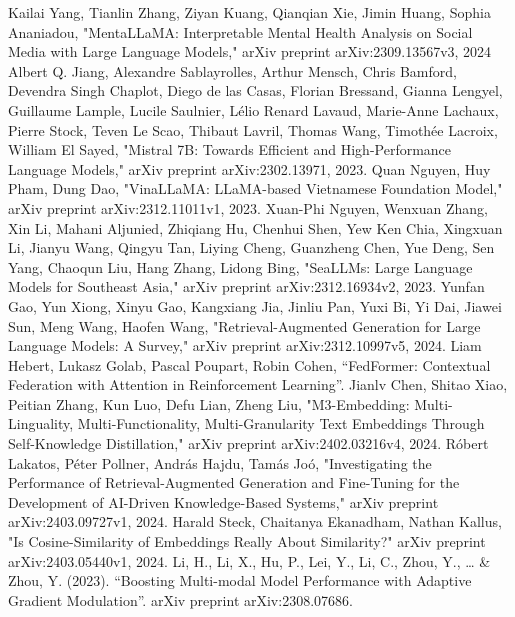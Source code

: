 \documentclass[conference]{IEEEtran}
\begin{document}
\begin{thebibliography}{9}
     Kailai Yang, Tianlin Zhang, Ziyan Kuang, Qianqian Xie, Jimin Huang, Sophia Ananiadou, "MentaLLaMA: Interpretable Mental Health Analysis on Social Media with Large Language Models," arXiv preprint arXiv:2309.13567v3, 2024
     Albert Q. Jiang, Alexandre Sablayrolles, Arthur Mensch, Chris Bamford, Devendra Singh Chaplot, Diego de las Casas, Florian Bressand, Gianna Lengyel, Guillaume Lample, Lucile Saulnier, Lélio Renard Lavaud, Marie-Anne Lachaux, Pierre Stock, Teven Le Scao, Thibaut Lavril, Thomas Wang, Timothée Lacroix, William El Sayed, "Mistral 7B: Towards Efficient and High-Performance Language Models," arXiv preprint arXiv:2302.13971, 2023.
     Quan Nguyen, Huy Pham, Dung Dao, "VinaLLaMA: LLaMA-based Vietnamese Foundation Model," arXiv preprint arXiv:2312.11011v1, 2023.
     Xuan-Phi Nguyen, Wenxuan Zhang, Xin Li, Mahani Aljunied, Zhiqiang Hu, Chenhui Shen, Yew Ken Chia, Xingxuan Li, Jianyu Wang, Qingyu Tan, Liying Cheng, Guanzheng Chen, Yue Deng, Sen Yang, Chaoqun Liu, Hang Zhang, Lidong Bing, "SeaLLMs: Large Language Models for Southeast Asia," arXiv preprint arXiv:2312.16934v2, 2023.
     Yunfan Gao, Yun Xiong, Xinyu Gao, Kangxiang Jia, Jinliu Pan, Yuxi Bi, Yi Dai, Jiawei Sun, Meng Wang, Haofen Wang, "Retrieval-Augmented Generation for Large Language Models: A Survey," arXiv preprint arXiv:2312.10997v5, 2024.
     Liam Hebert, Lukasz Golab, Pascal Poupart, Robin Cohen, ``FedFormer: Contextual Federation with Attention in Reinforcement Learning''.
     Jianlv Chen, Shitao Xiao, Peitian Zhang, Kun Luo, Defu Lian, Zheng Liu, "M3-Embedding: Multi-Linguality, Multi-Functionality, Multi-Granularity Text Embeddings Through Self-Knowledge Distillation," arXiv preprint arXiv:2402.03216v4, 2024.
     Róbert Lakatos, Péter Pollner, András Hajdu, Tamás Joó, "Investigating the Performance of Retrieval-Augmented Generation and Fine-Tuning for the Development of AI-Driven Knowledge-Based Systems," arXiv preprint arXiv:2403.09727v1, 2024.
     Harald Steck, Chaitanya Ekanadham, Nathan Kallus, "Is Cosine-Similarity of Embeddings Really About Similarity?" arXiv preprint arXiv:2403.05440v1, 2024.
     Li, H., Li, X., Hu, P., Lei, Y., Li, C., Zhou, Y., … \& Zhou, Y. (2023). ``Boosting Multi-modal Model Performance with Adaptive Gradient Modulation''. arXiv preprint arXiv:2308.07686.
\end{thebibliography}
\end{document}
